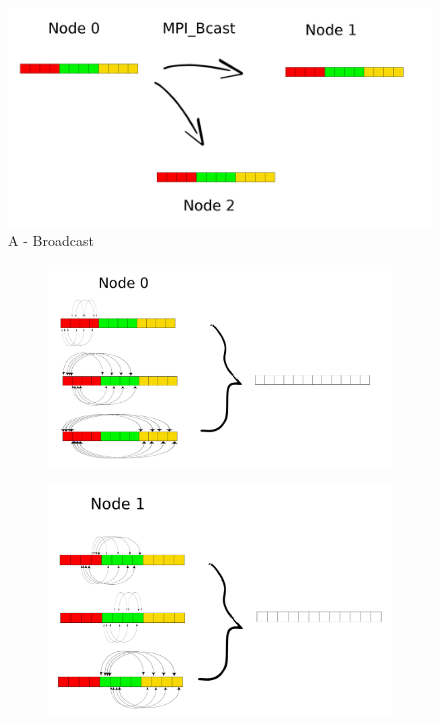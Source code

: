\documentclass[a4paper]{article}
\begin{document}
\begin{figure}[ht]
  \centering
  \includegraphics[width=0.6\linewidth]{broadcast}
  \caption{A - Broadcast}
  \label{fig:A2}
\end{figure}
\FloatBarrier

\begin{figure}[ht]
\begin{subfigure}{.5\textwidth}
  \centering
  \includegraphics[width=1\linewidth]{force_calculation_0}
\end{subfigure} %
\begin{subfigure}{.5\textwidth}
  \centering
  \includegraphics[width=1\linewidth]{force_calculation_1}

\end{subfigure}
\end{figure}
\end{document}
